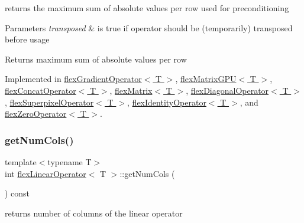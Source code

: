 returns the maximum sum of absolute values per row used for preconditioning 


\begin{DoxyParams}{Parameters}
{\em transposed} & is true if operator should be (temporarily) transposed before usage \\
\hline
\end{DoxyParams}
\begin{DoxyReturn}{Returns}
maximum sum of absolute values per row 
\end{DoxyReturn}


Implemented in \hyperlink{classflex_gradient_operator_a6acb61ea8abf404d63be4574976391bb}{flex\+Gradient\+Operator$<$ T $>$}, \hyperlink{classflex_matrix_g_p_u_aae4f81a403b6fff8ac73ccdf6c21399f}{flex\+Matrix\+G\+P\+U$<$ T $>$}, \hyperlink{classflex_concat_operator_a39b7aa1797025fb022630a63358a4072}{flex\+Concat\+Operator$<$ T $>$}, \hyperlink{classflex_matrix_a25cd9571e7056c4ad035a44a57e1d45d}{flex\+Matrix$<$ T $>$}, \hyperlink{classflex_diagonal_operator_aa9c144ae23fbcbcdcd14cc779182896a}{flex\+Diagonal\+Operator$<$ T $>$}, \hyperlink{classflex_superpixel_operator_a83c4978b05be05c45be7d2ea58e96b44}{flex\+Superpixel\+Operator$<$ T $>$}, \hyperlink{classflex_identity_operator_ac9127077af24910e90eb0239a2508306}{flex\+Identity\+Operator$<$ T $>$}, and \hyperlink{classflex_zero_operator_a2c7b6c1cddc5a79c4d2948855a20b3f1}{flex\+Zero\+Operator$<$ T $>$}.

\mbox{\label{classflex_linear_operator_add18da4274ec9105f7ba8852be35201a}} 
\subsubsection{\texorpdfstring{get\+Num\+Cols()}{getNumCols()}}
{\footnotesize\ttfamily template$<$typename T$>$ \\
int \hyperlink{classflex_linear_operator}{flex\+Linear\+Operator}$<$ T $>$\+::get\+Num\+Cols (\begin{DoxyParamCaption}{ }\end{DoxyParamCaption}) const\hspace{0.3cm}{\ttfamily [inline]}}



returns number of columns of the linear operator 

